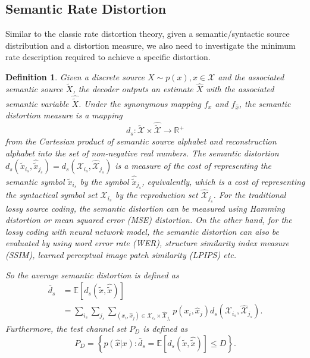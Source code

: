 \documentclass[12pt, draftclsnofoot,onecolumn]{IEEEtran}
\newtheorem{definition}{\bf{Definition}}
\begin{document}
\subsection{Semantic Rate Distortion}
Similar to the classic rate distortion theory, given a semantic/syntactic source distribution and a distortion measure, we also need to investigate the minimum rate description required to achieve a specific distortion.
\begin{definition}
Given a discrete source $X\sim p(x), x\in\mathcal{X}$ and the associated semantic source $\tilde{X}$, the decoder outputs an estimate $\hat{X}$ with the associated semantic variable $\hat{\tilde{X}}$. Under the synonymous mapping $f_{x}$ and $f_{\hat{x}}$, the semantic distortion measure is a mapping
\begin{equation}
d_s: \tilde{\mathcal{X}}\times \hat{\tilde{\mathcal{X}}}\to \mathbb{R}^{+}
\end{equation}
from the Cartesian product of semantic source alphabet and reconstruction alphabet into the set of non-negative real numbers. The semantic distortion $d_s(\tilde{x}_{i_s},\hat{\tilde{x}}_{j_s})=d_s(\mathcal{X}_{i_s},\hat{\mathcal{X}}_{j_s})$ is a measure of the cost of representing the semantic symbol $\tilde{x}_{i_s}$ by the symbol $\hat{\tilde{x}}_{j_s}$, equivalently, which is a cost of representing the syntactical symbol set $\mathcal{X}_{i_s}$ by the reproduction set $\hat{\mathcal{X}}_{j_s}$. For the traditional lossy source coding, the semantic distortion can be measured using Hamming distortion or mean squared error (MSE) distortion. On the other hand, for the lossy coding with neural network model, the semantic distortion can also be evaluated by using word error rate (WER), structure similarity index measure (SSIM), learned perceptual image patch similarity (LPIPS) etc.

So the average semantic distortion is defined as
\begin{equation}
\begin{aligned}
\bar{d}_s&=\mathbb{E}\left[d_s(\tilde{x},\hat{\tilde{x}})\right]\\
&=\sum_{i_s}\sum_{j_s}\sum_{(x_i,\hat{x}_j)\in \mathcal{X}_{i_s}\times \hat{\mathcal{X}}_{j_s}}p\left(x_i,\hat{x}_j\right)d_s(\mathcal{X}_{i_s},\hat{\mathcal{X}}_{j_s}).
\end{aligned}
\end{equation}
Furthermore, the test channel set $P_D$ is defined as
\begin{equation}
P_D=\left\{p(\hat{x}\left|x\right.): \bar{d}_s=\mathbb{E}\left[d_s\left(\tilde{x},\hat{\tilde{x}}\right)\right] \leq D\right\}.
\end{equation}
\end{definition}
\end{document}
